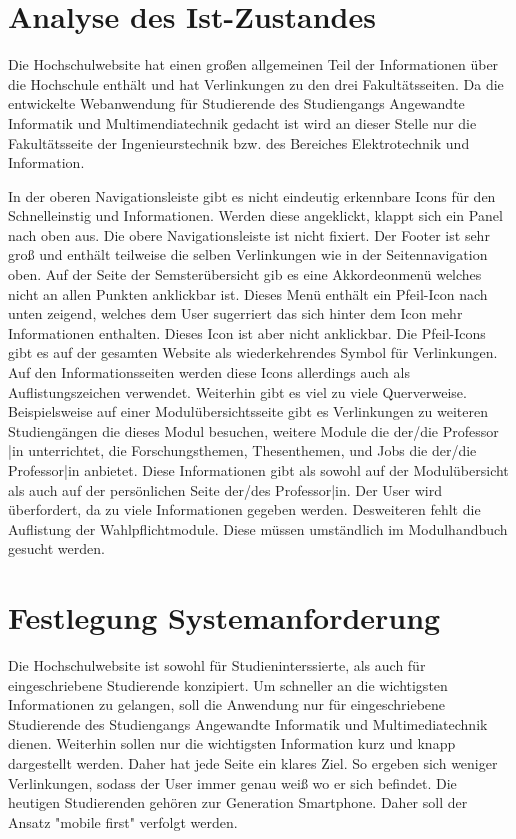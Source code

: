 \documentclass[12pt,					%
							 oneside,			%
							 a4paper,			%
							 halfparskip,		%
							 liststotoc,			%
							 bibtotoc,			%
							 fleqn,				%
							 pointlessnumbers]	%
							 {scrreprt}
\begin{document}
		\section{Analyse des Ist-Zustandes}
		Die Hochschulwebsite hat einen großen allgemeinen Teil der Informationen über die Hochschule enthält und hat Verlinkungen zu den drei Fakultätsseiten. Da die entwickelte Webanwendung für Studierende des Studiengangs Angewandte Informatik und Multimendiatechnik gedacht ist wird an dieser Stelle nur die Fakultätsseite der Ingenieurstechnik bzw. des Bereiches Elektrotechnik und Information.
		
		In der oberen Navigationsleiste gibt es nicht eindeutig erkennbare Icons für den Schnelleinstig und Informationen. Werden diese angeklickt, klappt sich ein Panel nach oben aus. Die obere Navigationsleiste ist nicht fixiert. Der Footer ist sehr groß und enthält teilweise die selben Verlinkungen wie in der Seitennavigation oben. Auf der Seite der Semsterübersicht gib es eine Akkordeonmenü welches nicht an allen Punkten anklickbar ist. Dieses Menü enthält ein Pfeil-Icon nach unten zeigend, welches dem User sugerriert das sich hinter dem Icon mehr Informationen enthalten.  Dieses Icon ist aber nicht anklickbar. Die Pfeil-Icons gibt es auf der gesamten Website als wiederkehrendes Symbol für Verlinkungen. Auf den Informationsseiten werden diese Icons allerdings auch als Auflistungszeichen verwendet. Weiterhin gibt es viel zu viele Querverweise. Beispielsweise auf einer Modulübersichtsseite gibt es Verlinkungen zu weiteren Studiengängen die dieses Modul besuchen, weitere Module die der/die Professor |in unterrichtet, die Forschungsthemen, Thesenthemen, und Jobs die der/die Professor|in anbietet. Diese Informationen gibt als sowohl auf der Modulübersicht als auch auf der persönlichen Seite der/des Professor|in. Der User wird überfordert, da zu viele Informationen gegeben werden. Desweiteren fehlt die Auflistung der Wahlpflichtmodule. Diese müssen umständlich im Modulhandbuch gesucht werden. 

		\section{Festlegung Systemanforderung}
		Die Hochschulwebsite ist sowohl für Studieninterssierte, als auch für eingeschriebene Studierende konzipiert. Um schneller an die wichtigsten Informationen zu gelangen, soll die Anwendung nur für eingeschriebene Studierende des Studiengangs Angewandte Informatik und Multimediatechnik dienen. Weiterhin sollen nur die wichtigsten Information kurz und knapp dargestellt werden. Daher hat jede Seite ein klares Ziel.	So ergeben sich weniger Verlinkungen, sodass der User immer genau weiß wo er sich befindet. Die heutigen Studierenden gehören zur Generation Smartphone. Daher soll der Ansatz "mobile first" verfolgt werden.
	
\end{document}
